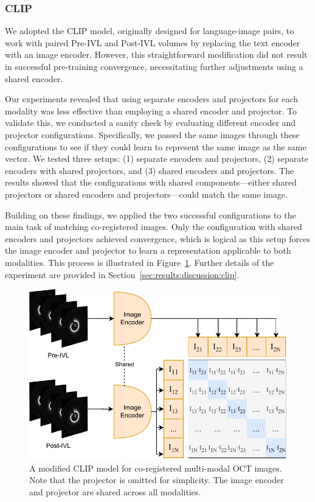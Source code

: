 \documentclass[a4paper,11pt,oneside]{report}
\begin{document}
\subsubsection{CLIP}\label{sec:implementation:clip}
We adopted the CLIP model, originally designed for language-image pairs, to work with paired Pre-IVL and Post-IVL volumes by replacing the text encoder with an image encoder. However, this straightforward modification did not result in successful pre-training convergence, necessitating further adjustments using a shared encoder.

Our experiments revealed that using separate encoders and projectors for each modality was less effective than employing a shared encoder and projector. To validate this, we conducted a sanity check by evaluating different encoder and projector configurations. Specifically, we passed the same images through these configurations to see if they could learn to represent the same image as the same vector. We tested three setups: (1) separate encoders and projectors, (2) separate encoders with shared projectors, and (3) shared encoders and projectors. The results showed that the configurations with shared components—either shared projectors or shared encoders and projectors—could match the same image.

Building on these findings, we applied the two successful configurations to the main task of matching co-registered images. Only the configuration with shared encoders and projectors achieved convergence, which is logical as this setup forces the image encoder and projector to learn a representation applicable to both modalities. This process is illustrated in Figure~\ref{fig:clip-oct}. Further details of the experiment are provided in Section~\ref{sec:results:discussion:clip}.

\begin{figure}[hb]
    \centering
    \includegraphics[width=0.65\linewidth]{figures/fig_implementation_clip_oct.pdf}
    \caption{A modified CLIP model for co-registered multi-modal OCT images. Note that the projector is omitted for simplicity. The image encoder and projector are shared across all modalities.}
    \label{fig:clip-oct}
\end{figure}
\end{document}
